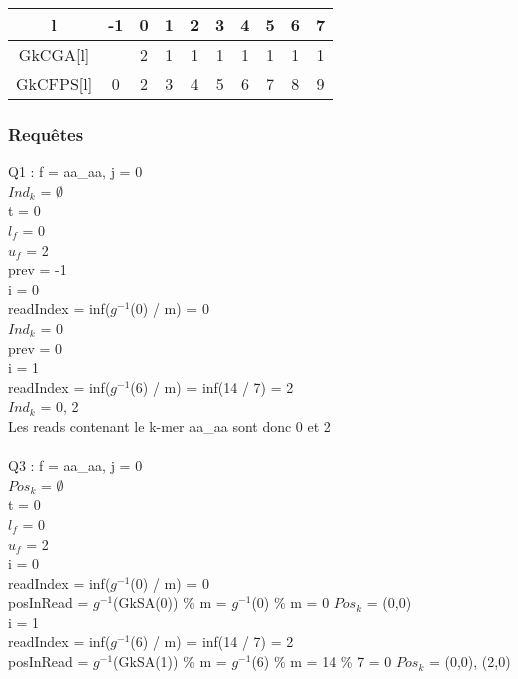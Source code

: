 \documentclass[12pt]{article}
\begin{document}
\begin{tabular}{|c|c|c|c|c|c|c|c|c|c|}
	\hline
	l & -1 & 0 & 1 & 2 & 3 & 4 & 5 & 6 & 7 \\
	\hline
	GkCGA[l] & & 2 & 1 & 1 & 1 & 1 & 1 & 1 & 1 \\
	\hline
	GkCFPS[l] & 0 & 2 & 3 & 4 & 5 & 6 & 7 & 8 & 9 \\
	\hline
\end{tabular}

\newpage

\subsubsection{Requêtes}

Q1 : f = aa\_aa, j = 0 \\

$Ind_k$ = $\emptyset$ \\
t = 0 \\
$l_f$ = 0 \\
$u_f$ = 2 \\
prev = -1 \\
i = 0 \\
\indent readIndex = inf($g^{-1}$(0) / m) = 0 \\
\indent $Ind_k$ = {0} \\
\indent prev = 0 \\
i = 1 \\
\indent readIndex = inf($g^{-1}$(6) / m) = inf(14 / 7) = 2 \\
\indent $Ind_k$ = {0, 2} \\

Les reads contenant le k-mer aa\_aa sont donc 0 et 2 \\ \\

Q3 : f = aa\_aa, j = 0 \\

$Pos_k$ = $\emptyset$ \\
t = 0 \\
$l_f$ = 0 \\
$u_f$ = 2 \\
i = 0 \\
\indent readIndex = inf($g^{-1}$(0) / m) = 0 \\
\indent posInRead = $g^{-1}$(GkSA(0)) \% m = $g^{-1}$(0) \% m = 0
\indent $Pos_k$ = {(0,0)} \\
i = 1 \\
\indent readIndex = inf($g^{-1}$(6) / m) = inf(14 / 7) = 2 \\
\indent posInRead = $g^{-1}$(GkSA(1)) \% m = $g^{-1}$(6) \% m = 14 \% 7 = 0
\indent $Pos_k$ = {(0,0), (2,0)} \\
\end{document}
